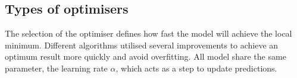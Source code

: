\subsection{Types of optimisers}
The selection of the optimiser defines how fast the model will achieve the local minimum.
Different algorithms utilised several improvements to achieve an optimum result more quickly and avoid overfitting.
All model share the same parameter, the learning rate $\alpha$, which acts as a step to update predictions.



